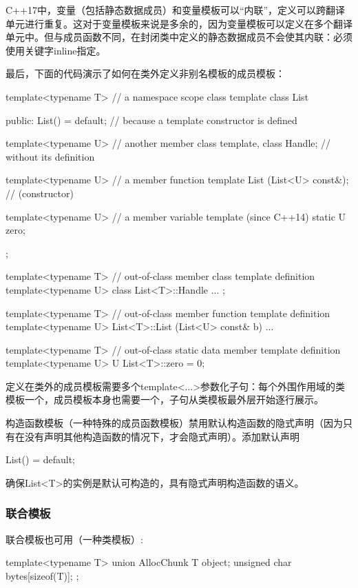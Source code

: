 C++17中，变量（包括静态数据成员）和变量模板可以“内联”，定义可以跨翻译单元进行重复。这对于变量模板来说是多余的，因为变量模板可以定义在多个翻译单元中。但与成员函数不同，在封闭类中定义的静态数据成员不会使其内联：必须使用关键字inline指定。

最后，下面的代码演示了如何在类外定义非别名模板的成员模板：

\begin{cpp}
template<typename T> // a namespace scope class template
class List {
	public:
	List() = default; // because a template constructor is defined
	
	template<typename U> // another member class template,
	class Handle; // without its definition
	
	template<typename U> // a member function template
	List (List<U> const&); // (constructor)
	
	template<typename U> // a member variable template (since C++14)
	static U zero;
};

template<typename T> // out-of-class member class template definition
  template<typename U>
class List<T>::Handle {
	...
};

template<typename T> // out-of-class member function template definition
  template<typename U>
List<T>::List (List<U> const& b) {
	...
}

template<typename T> // out-of-class static data member template definition
  template<typename U>
U List<T>::zero = 0;
\end{cpp}

定义在类外的成员模板需要多个template<...>参数化子句：每个外围作用域的类模板一个，成员模板本身也需要一个，子句从类模板最外层开始逐行展示。

构造函数模板（一种特殊的成员函数模板）禁用默认构造函数的隐式声明（因为只有在没有声明其他构造函数的情况下，才会隐式声明）。添加默认声明

\begin{cpp}
List() = default;
\end{cpp}

确保List<T>的实例是默认可构造的，具有隐式声明构造函数的语义。

\subsubsection{联合模板}

联合模板也可用（一种类模板）:

\begin{cpp}
template<typename T>
union AllocChunk {
	T object;
	unsigned char bytes[sizeof(T)];
};
\end{cpp}

